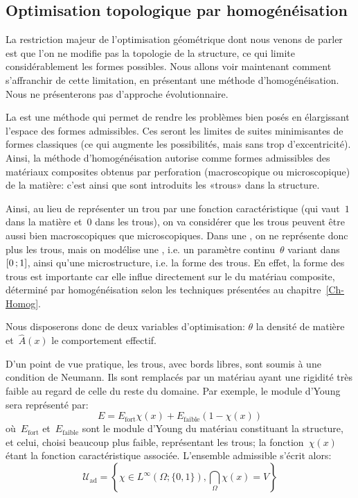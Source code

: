 \medskip
\subsection{Optimisation topologique par homogénéisation}

La restriction majeur de l'optimisation géométrique dont nous venons de parler est que l'on ne modifie pas la topologie de la structure, ce qui limite considérablement les formes possibles.
Nous allons voir maintenant comment s'affranchir de cette limitation, en présentant une méthode d'homogénéisation. Nous ne présenterons pas d'approche évolutionnaire.

\medskip
La  est une méthode qui permet de rendre les problèmes bien posés en élargissant l'espace des formes admissibles.
Ces  seront les limites de suites minimisantes de formes classiques (ce qui augmente les possibilités, mais sans trop d'excentricité).
Ainsi, la méthode d'homogénéisation autorise comme formes admissibles des matériaux composites obtenus par perforation (macroscopique ou microscopique) de la matière: c'est ainsi que sont introduits les «trous» dans la structure.

\medskip
Ainsi, au lieu de représenter un trou par une fonction caractéristique (qui vaut~$1$ dans la matière et~$0$ dans les trous), on va considérer que les trous peuvent être aussi bien macroscopiques que microscopiques. Dans une , on ne représente donc plus les trous, mais on modélise une , i.e. un paramètre continu~$\theta$ variant dans~$\mathopen{[}0\,;1\mathclose{]}$, ainsi qu'une microstructure, i.e. la forme des trous.
En effet, la forme des trous est importante car elle influe directement sur le  du matériau composite, déterminé par homogénéisation selon les techniques présentées au chapitre~\ref{Ch-Homog}.

Nous disposerons donc de deux variables d'optimisation: $\theta$ la densité de matière et~$\hat{A}(x)$ le comportement effectif.

\medskip
D'un point de vue pratique, les trous, avec bords libres, sont soumis à une condition de Neumann. Ils sont remplacés par un matériau ayant une rigidité très faible au regard de celle du reste du domaine.
Par exemple, le module d'Young sera représenté par: 
\begin{equation}\label{Eq-EcvOpt}
E = E_{\text{fort}} \chi(x) + E_{\text{faible}}(1-\chi(x))
\end{equation}
où~$E_{\text{fort}}$ et~$E_{\text{faible}}$ sont le module d'Young du matériau constituant la structure, et celui, choisi beaucoup plus faible, représentant les trous; la fonction~$\chi(x)$ étant la fonction caractéristique associée.
L'ensemble admissible s'écrit alors:
\begin{equation}
\mathscr{U}_{\text{ad}}=\left\{ \chi\in L^\infty(\Omega;\{0,1\}),
\dint_\Omega \chi(x) = V \right\}
\end{equation}


